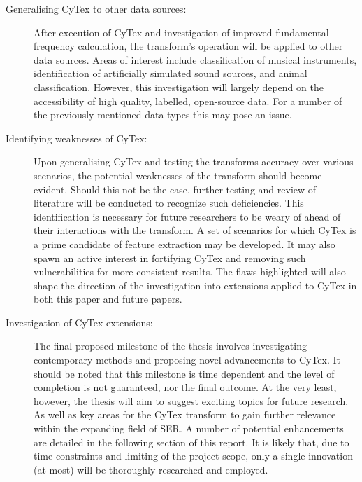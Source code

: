 \begin{description}
\item[Generalising CyTex to other data sources:]
After execution of CyTex and investigation of improved fundamental frequency calculation, the transform's operation will be applied to other data sources. Areas of interest include classification of musical instruments, identification of artificially simulated sound sources, and animal classification. However, this investigation will largely depend on the accessibility of high quality, labelled, open-source data. For a number of the previously mentioned data types this may pose an issue.

\item[Identifying weaknesses of CyTex:]
Upon generalising CyTex and testing the transforms accuracy over various scenarios, the potential weaknesses of the transform should become evident. Should this not be the case, further testing and review of literature will be conducted to recognize such deficiencies. This identification is necessary for future researchers to be weary of ahead of their interactions with the transform. A set of scenarios for which CyTex is a prime candidate of feature extraction may be developed. It may also spawn an active interest in fortifying CyTex and removing such vulnerabilities for more consistent results. The flaws highlighted will also shape the direction of the investigation into extensions applied to CyTex in both this paper and future papers.

\item[Investigation of CyTex extensions:]
The final proposed milestone of the thesis involves investigating contemporary methods and proposing novel advancements to CyTex. It should be noted that this milestone is time dependent and the level of completion is not guaranteed, nor the final outcome. At the very least, however, the thesis will aim to suggest exciting topics for future research. As well as key areas for the CyTex transform to gain further relevance within the expanding field of SER. A number of potential enhancements are detailed in the following section of this report. It is likely that, due to time constraints and limiting of the project scope, only a single innovation (at most) will be thoroughly researched and employed.

\end{description}



